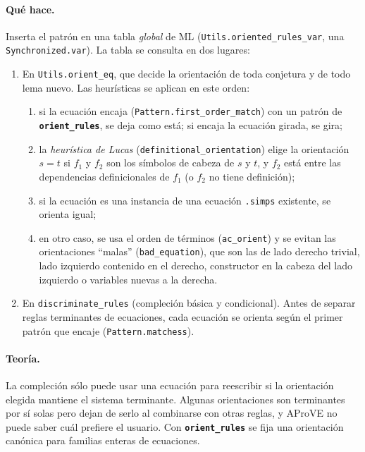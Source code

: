 \documentclass[11pt,a4paper]{article}
\newcommand{\isa}[1]{\texttt{#1}}
\newcommand{\cmd}[1]{\textbf{\texttt{#1}}}
\theoremstyle{definition}
\theoremstyle{remark}
\begin{document}
\paragraph{Qué hace.}
Inserta el patrón en una tabla \emph{global} de ML (\isa{Utils.oriented\_rules\_var},
una \isa{Synchronized.var}). La tabla se consulta en dos lugares:
\begin{enumerate}[nosep]
  \item En \isa{Utils.orient\_eq}, que decide la orientación de toda conjetura y de
        todo lema nuevo. Las heurísticas se aplican en este orden:
    \begin{enumerate}[nosep]
      \item si la ecuación encaja (\isa{Pattern.first\_order\_match}) con un patrón de
            \cmd{orient\_rules}, se deja como está; si encaja la ecuación girada,
            se gira;
      \item la \emph{heurística de Lucas} (\isa{definitional\_orientation}) elige
            la orientación $s = t$ si $f_1$ y $f_2$ son los símbolos de cabeza de
            $s$ y $t$, y $f_2$ está entre las dependencias definicionales de $f_1$
            (o $f_2$ no tiene definición);
      \item si la ecuación es una instancia de una ecuación \isa{.simps}
            existente, se orienta igual;
      \item en otro caso, se usa el orden de términos (\isa{ac\_orient}) y se evitan
            las orientaciones ``malas'' (\isa{bad\_equation}), que son las de lado
            derecho trivial, lado izquierdo contenido en el derecho, constructor en
            la cabeza del lado izquierdo o variables nuevas a la derecha.
    \end{enumerate}
  \item En \isa{discriminate\_rules} (compleción básica y condicional). Antes de
        separar reglas terminantes de ecuaciones, cada ecuación se orienta según
        el primer patrón que encaje (\isa{Pattern.matchess}).
\end{enumerate}

\paragraph{Teoría.}
La compleción sólo puede usar una ecuación para reescribir si la orientación
elegida mantiene el sistema terminante. Algunas orientaciones son terminantes por
sí solas pero dejan de serlo al combinarse con otras reglas, y AProVE no puede saber
cuál prefiere el usuario. Con \cmd{orient\_rules} se fija una orientación canónica
para familias enteras de ecuaciones.
\end{document}
